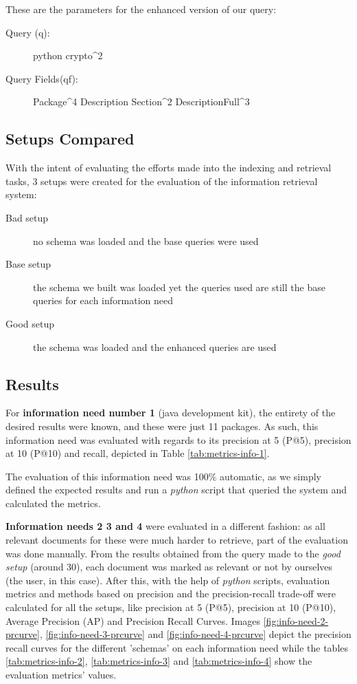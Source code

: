 These are the parameters for the enhanced version of our query:

\begin{description}
    \item[Query (q):] python crypto\^{}2
    \item[Query Fields(qf):] Package\^{}4 Description Section\^{}2 DescriptionFull\^{}3
\end{description}

\subsection{Setups Compared}

With the intent of evaluating the efforts made into the indexing and retrieval tasks, 3 setups were created for the evaluation of the information retrieval system:

\begin{description}
    \item[Bad setup] no schema was loaded and the base queries were used
    \item[Base setup] the schema we built was loaded yet the queries used are still the base queries for each information need
    \item[Good setup] the schema was loaded and the enhanced queries are used
\end{description}

\subsection{Results}


For \textbf{information need number 1} (java development kit), the entirety of the desired results were known, and these were just 11 packages. As such, this information need was evaluated with regards to its precision at 5 (P@5), precision at 10 (P@10) and recall, depicted in Table \ref{tab:metrics-info-1}. 




The evaluation of this information need was 100\% automatic, as we simply defined the expected results and run a \emph{python} script that queried the system and calculated the metrics.


\textbf{Information needs 2 3 and 4} were evaluated in a different fashion: as all relevant documents for these were much harder to retrieve, part of the evaluation was done manually. From the results obtained from the query made to the \emph{good setup} (around 30), each document was marked as relevant or not by ourselves (the user, in this case). After this, with the help of \emph{python} scripts, evaluation metrics and methods based on precision and the precision-recall trade-off were calculated for all the setups, like precision at 5 (P@5), precision at 10 (P@10), Average Precision (AP) and Precision Recall Curves. Images \ref{fig:info-need-2-prcurve}, \ref{fig:info-need-3-prcurve} and \ref{fig:info-need-4-prcurve} depict the precision recall curves for the different 'schemas' on each information need while the tables \ref{tab:metrics-info-2}, \ref{tab:metrics-info-3} and \ref{tab:metrics-info-4} show the evaluation metrics' values.

